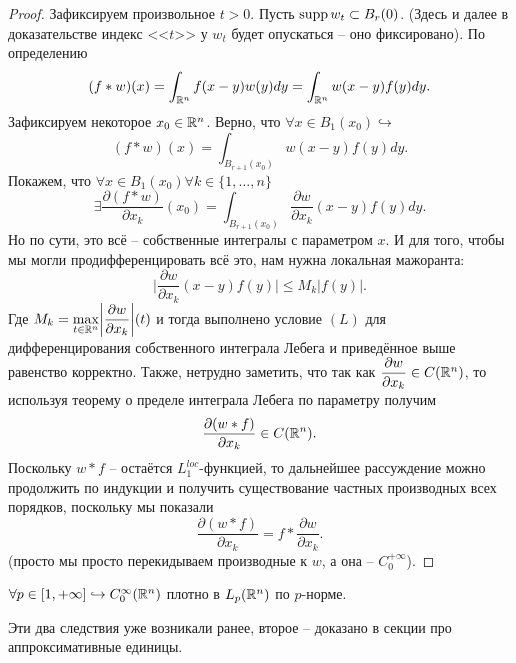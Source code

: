\begin{proof}
    Зафиксируем произвольное $t > 0$.
    Пусть $\operatorname{supp} w_t \subset B_r(0)$.
    (Здесь и далее в доказательстве индекс <<$t$>> у $w_t$ будет опускаться -- оно фиксировано).
    По определению
    \[
        (f * w)(x) = \int_{\mathbb{R}^n} f(x - y)w(y) dy = \int_{\mathbb{R}^n} w(x - y)f(y)dy.
    \]
    Зафиксируем некоторое $x_0 \in \mathbb{R}^n$.
    Верно, что $\forall x \in B_1(x_0) \hookrightarrow$
    \[
        (f * w)(x) = \int_{B_{r + 1}(x_0)}w(x - y)f(y)dy.
    \]
    Покажем, что $\forall x \in B_1(x_0) \forall k \in \{1, \ldots, n\}$
    \[
        \exists \dfrac{\partial(f * w)}{\partial x_k}(x_0) = \int_{B_{r + 1}(x_0)}\dfrac{\partial w}{\partial x_k}(x - y) f(y)dy.
    \]
    Но по сути, это всё -- собственные интегралы с параметром $x$.
    И для того, чтобы мы могли продифференцировать всё это, нам нужна локальная мажоранта:
    \[
        \biggr|\dfrac{\partial w}{\partial x_k}(x - y)f(y) \biggr| \leq M_k |f(y)|.
    \]
    Где $M_k = \max\limits_{t \in \mathbb{R}^n} \biggr|\dfrac{\partial w}{\partial x_k}\biggr|(t)$ и тогда выполнено условие $(L)$ для дифференцирования собственного интеграла Лебега и приведённое выше равенство корректно.
    Также, нетрудно заметить, что так как $\dfrac{\partial w}{\partial x_k} \in C(\mathbb{R}^n)$, то используя теорему о пределе интеграла Лебега по параметру получим
    \[
        \dfrac{\partial(w * f)}{\partial x_k} \in C(\mathbb{R}^n).
    \]
    Поскольку $w * f$ -- остаётся $L_1^{loc}$-функцией, то дальнейшее рассуждение можно продолжить по индукции и получить существование частных производных всех порядков, поскольку мы показали
    \[
        \dfrac{\partial (w * f)}{\partial x_k} = f * \dfrac{\partial w}{\partial x_k}.
    \]
    (просто мы просто перекидываем производные к $w$, а она -- $C^{+\infty}_0$).
\end{proof}
\begin{corollary}
    $\forall p \in [1, +\infty] \hookrightarrow C_0^{\infty}(\mathbb{R}^n)$ плотно в $L_p(\mathbb{R}^n)$ по $p$-норме.
\end{corollary}
\begin{note}
    Эти два следствия уже возникали ранее, второе -- доказано в секции про аппроксимативные единицы.
\end{note}

